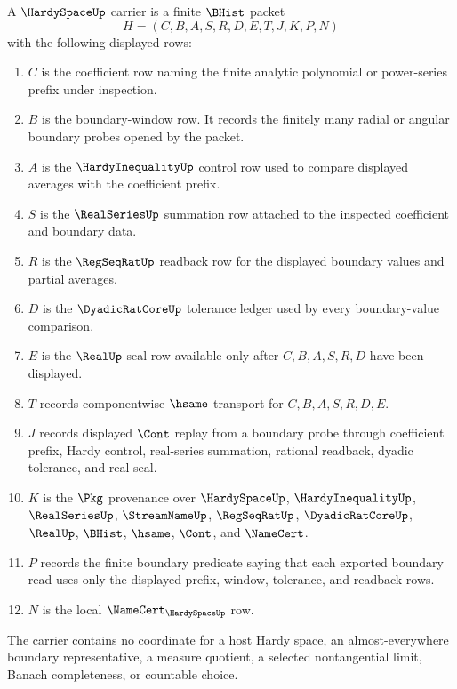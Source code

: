 \begin{definition}
\label{def:hardy-space-carrier}
A $\HardySpaceUp$ carrier is a finite $\BHist$ packet
$$
H=(C,B,A,S,R,D,E,T,J,K,P,N)
$$
with the following displayed rows:
\begin{enumerate}
\item $C$ is the coefficient row naming the finite analytic polynomial or power-series prefix under inspection.
\item $B$ is the boundary-window row. It records the finitely many radial or angular boundary probes opened by the packet.
\item $A$ is the $\HardyInequalityUp$ control row used to compare displayed averages with the coefficient prefix.
\item $S$ is the $\RealSeriesUp$ summation row attached to the inspected coefficient and boundary data.
\item $R$ is the $\RegSeqRatUp$ readback row for the displayed boundary values and partial averages.
\item $D$ is the $\DyadicRatCoreUp$ tolerance ledger used by every boundary-value comparison.
\item $E$ is the $\RealUp$ seal row available only after $C,B,A,S,R,D$ have been displayed.
\item $T$ records componentwise $\hsame$ transport for $C,B,A,S,R,D,E$.
\item $J$ records displayed $\Cont$ replay from a boundary probe through coefficient prefix, Hardy control, real-series summation, rational readback, dyadic tolerance, and real seal.
\item $K$ is the $\Pkg$ provenance over $\HardySpaceUp$, $\HardyInequalityUp$, $\RealSeriesUp$, $\StreamNameUp$, $\RegSeqRatUp$, $\DyadicRatCoreUp$, $\RealUp$, $\BHist$, $\hsame$, $\Cont$, and $\NameCert$.
\item $P$ records the finite boundary predicate saying that each exported boundary read uses only the displayed prefix, window, tolerance, and readback rows.
\item $N$ is the local $\NameCert_{\HardySpaceUp}$ row.
\end{enumerate}
The carrier contains no coordinate for a host Hardy space, an almost-everywhere boundary representative, a measure quotient, a selected nontangential limit, Banach completeness, or countable choice.
\end{definition}

